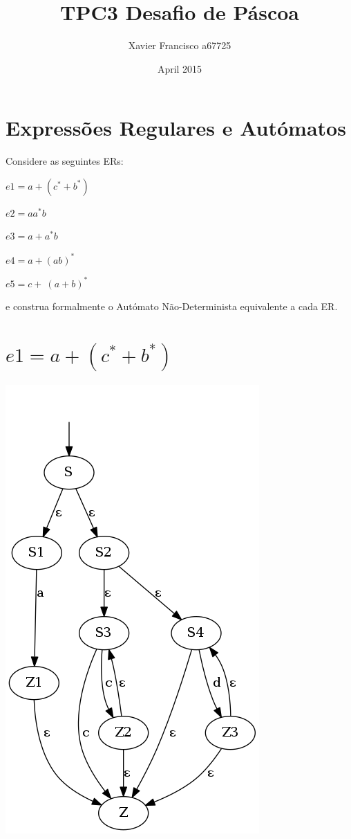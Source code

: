 \documentclass{article}
\title{TPC3 Desafio de Páscoa}
\author{Xavier Francisco a67725}
\date{April 2015}
\begin{document}
\maketitle

\section{Expressões Regulares e Autómatos}

Considere as seguintes ERs:

    $e1 = a + (c^{*} + b^{*})$
    
    $e2 = a a^{*} b $
    
    $e3 = a + a^{*} b $
    
    $e4 = a + (a b)^{*} $
    
    $e5 = c +\ (a + b)^{*} $

e construa formalmente o Autómato Não-Determinista equivalente a cada ER.

\section{$e1 = a + (c^{*} + b^{*})$}
\includegraphics[scale=0.5]{e1.png}
\end{document}
